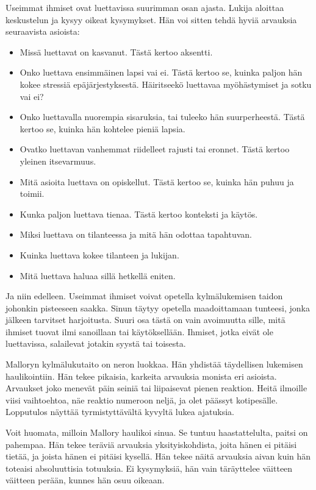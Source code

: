Useimmat ihmiset ovat luettavissa suurimman osan ajasta. Lukija aloittaa keskustelun ja kysyy oikeat kysymykset. Hän voi sitten tehdä hyviä arvauksia seuraavista asioista:
\begin{itemize}
\item Missä luettavat on kasvanut. Tästä kertoo aksentti.
\item Onko luettava ensimmäinen lapsi vai ei. Tästä kertoo se, kuinka paljon hän kokee stressiä epäjärjestyksestä. Häiritseekö luettavaa myöhästymiset ja sotku vai ei?
\item Onko luettavalla nuorempia sisaruksia, tai tuleeko hän suurperheestä. Tästä kertoo se, kuinka hän kohtelee pieniä lapsia.
\item Ovatko luettavan vanhemmat riidelleet rajusti tai eronnet. Tästä kertoo yleinen itsevarmuus.
\item Mitä asioita luettava on opiskellut. Tästä kertoo se, kuinka hän puhuu ja toimii.
\item Kunka paljon luettava tienaa. Tästä kertoo konteksti ja käytös.
\item Miksi luettava on tilanteessa ja mitä hän odottaa tapahtuvan.
\item Kuinka luettava kokee tilanteen ja lukijan.
\item Mitä luettava haluaa sillä hetkellä eniten.
\end{itemize}
Ja niin edelleen. Useimmat ihmiset voivat opetella kylmälukemisen taidon johonkin pisteeseen saakka. Sinun täytyy opetella maadoittamaan tunteesi, jonka jälkeen tarvitset harjoitusta. Suuri osa tästä on vain avoimuutta sille, mitä ihmiset tuovat ilmi sanoillaan tai käytöksellään. Ihmiset, jotka eivät ole luettavissa, salailevat jotakin syystä tai toisesta.

Malloryn kylmälukutaito on neron luokkaa. Hän yhdistää täydellisen lukemisen haulikointiin. Hän tekee pikaisia, karkeita arvauksia monista eri asioista. Arvaukset joko menevät päin seiniä tai liipaisevat pienen reaktion. Heitä ilmoille viisi vaihtoehtoa, näe reaktio numeroon neljä, ja olet päässyt kotipesälle. Lopputulos näyttää tyrmistyttävältä kyvyltä lukea ajatuksia.

Voit huomata, milloin Mallory haulikoi sinua. Se tuntuu haastattelulta, paitsi on pahempaa. Hän tekee teräviä arvauksia yksityiskohdista, joita hänen ei pitäisi tietää, ja joista hänen ei pitäisi kysellä. Hän tekee näitä arvauksia aivan kuin hän toteaisi absoluuttisia totuuksia. Ei kysymyksiä, hän vain täräyttelee väitteen väitteen perään, kunnes hän osuu oikeaan.

